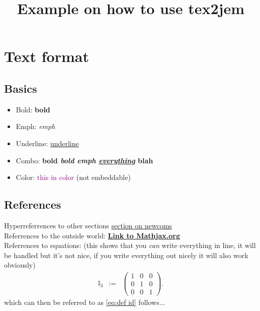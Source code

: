 

\newcommand{\bcite}[1]{\href{#1}{\textbf{Link}.}}
\newcommand{\RR}{$\mathbb R$}
\newcommand{\eqa}[1]{\begin{eqnarray}#1\end{eqnarray}}

\title{Example on how to use tex2jem}

 
\maketitle

\section{Text format}
\subsection{Basics}
\begin{itemize}
    \item Bold: \textbf{bold}
    \item Emph: \emph{emph}
    \item Underline: \underline{underline}
    \item Combo: \textbf{bold \emph{bold emph \underline{everything}} blah}
    \item Color: \textcolor{DarkMagenta}{this in color} (not embeddable)
\end{itemize}

\subsection{References}
Hyperreferrences to other sections \hyperref[sec:newcom]{section on newcoms}\\
Referrences to the outside world: \href{http://www.mathjax.org}{\textbf{Link to Mathjax.org}}\\
Referrences to equations: (this shows that you \emph{can} write everything in line, it will be handled but it's not nice, if you write everything out nicely it will also work obviously)
\eqa{ \mathbb I_3 &:=& \left(\begin{array}{ccc}1&0&0\\0&1&0\\0&0&1 \end{array}\right).\label{eq:def id}}
which can then be referred to as \eqref{eq:def id} follows...\\

